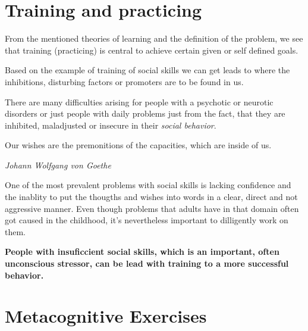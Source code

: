 \documentclass[../main.tex]{subfiles}
\begin{document}
        \chapter{Training and practicing}

        From the mentioned theories of learning and the definition of the problem, we see that training (practicing) is central to achieve certain given or self defined goals.


        Based on the example of training of social skills we can get leads to where the inhibitions, disturbing factors or promoters are to be found in us.

        There are many difficulties arising for people with a psychotic or neurotic disorders or just people with daily problems just from the fact, that they are inhibited, maladjusted or insecure in their \emph{social behavior}.


\epigraph{Our wishes are the premonitions of the capacities, which are inside of us.}{\textit{Johann Wolfgang von Goethe}}

One of the most prevalent problems with social skills is lacking confidence and the inablity to put the thougths and wishes into words in a clear, direct and not aggressive manner. Even though problems that adults have in that domain often got caused in the childhood, it's nevertheless important to dilligently work on them.

\textbf{People with insuficcient social skills, which is an important, often unconscious stressor, can be lead with training to a more successful behavior.}

\vspace{1cm}


  \chapter{Metacognitive Exercises}\label{metacognitive}
  
\end{document}
